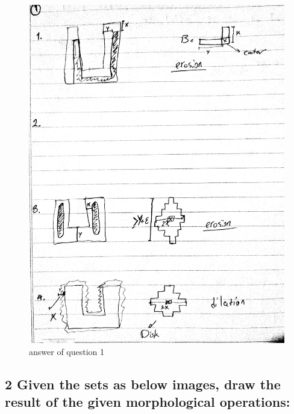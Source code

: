 \documentclass[11pt]{article}
\makeatletter
\def\maxwidth{\ifdim\Gin@nat@width>\linewidth\linewidth
    \else\Gin@nat@width\fi}
\let\Oldincludegraphics\includegraphics
\renewcommand{\includegraphics}[1]{\Oldincludegraphics[width=.8\maxwidth]{#1}}
\makeatother
\begin{document}
    \begin{figure}
\centering
\includegraphics{wiki/1_6.jpg}
\caption{answer of question 1}
\end{figure}

    \hypertarget{given-the-sets-as-below-images-draw-the-result-of-the-given-morphological-operations}{%
\subsection{2 Given the sets as below images, draw the result of the
given morphological
operations:}\label{given-the-sets-as-below-images-draw-the-result-of-the-given-morphological-operations}}
\end{document}

